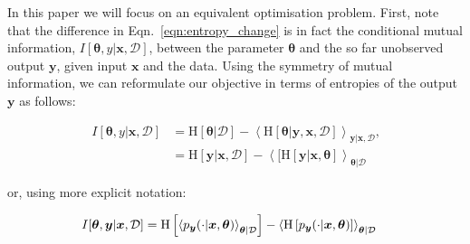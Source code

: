 \documentclass[twoside]{article}
\newcommand{\bx}{\bm{x}}
\newcommand{\by}{\bm{y}}
\newcommand{\param}{\bm{\theta}}
\newcommand{\x}{\bm{x}}
\newcommand{\y}{\bm{y}}
\newcommand{\data}{\mathcal{D}}
\newcommand{\Hu}{\mathrm{H}}
\begin{document}
In this paper we will focus on an equivalent optimisation problem. First, note that the difference in Eqn.\ \eqref{eqn:entropy_change} is in fact the conditional mutual information, $I[\param,y\vert\x,\data]$, between the parameter $\param$ and the so far unobserved output $\y$, given input $\x$ and the data. Using the symmetry of mutual information, we can reformulate our objective in terms of entropies of the output $\y$ as follows:

\begin{align}
I[\param,y\vert\x,\data] &= \mathrm{H}[\param | \data] - \left\langle \mathrm{H}[\param| \by, \bx, \data]\right\rangle_{\y\vert\x,\data}\mbox{,}\label{eqn:info1}\\
	&= \mathrm{H}[\y \vert \x, \data] - \left\langle [ \mathrm{H}[\y\vert\x,\param]\right\rangle_{\param\vert\data}\label{eqn:info2}
\end{align}

or, using more explicit notation:

\begin{align}
	I[\param,\y\vert\x,\data] &= \Hu\left[\left\langle p_{\y}(\cdot\vert\x,\param)\right\rangle_{\param\vert\data}\right] - \left\langle \Hu\left[p_{\y}(\cdot\vert\x,\param)\right]\right\rangle_{\param\vert\data}\notag
\end{align}
\end{document}
